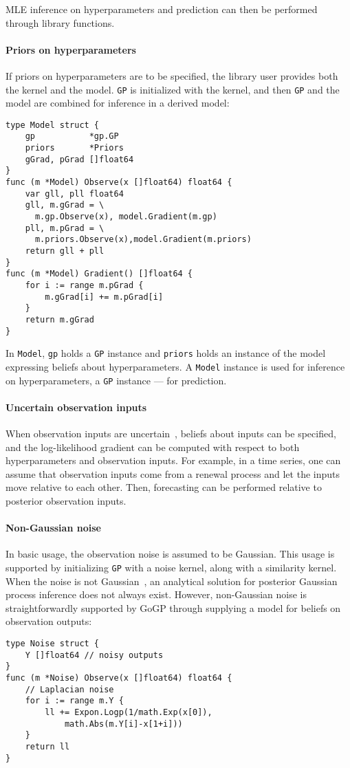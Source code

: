 \documentclass[sigplan,review]{acmart}\settopmatter{printfolios=true,printccs=false,printacmref=false}
\begin{document}
MLE inference on hyperparameters and prediction can then be performed
through library functions.

\paragraph{Priors on hyperparameters}

If priors on hyperparameters are to be specified, the library
user provides both the kernel and the model.  \lstinline{GP} is
initialized with the kernel, and then \lstinline{GP} and the
model are combined for inference in a derived model:
\begin{lstlisting}
type Model struct {
    gp           *gp.GP
    priors       *Priors
    gGrad, pGrad []float64
}
func (m *Model) Observe(x []float64) float64 {
    var gll, pll float64
    gll, m.gGrad = \
      m.gp.Observe(x), model.Gradient(m.gp)
    pll, m.pGrad = \
      m.priors.Observe(x),model.Gradient(m.priors)
    return gll + pll
}
func (m *Model) Gradient() []float64 {
	for i := range m.pGrad {
		m.gGrad[i] += m.pGrad[i]
	}
	return m.gGrad
}
\end{lstlisting}
In \lstinline{Model}, \lstinline{gp} holds a \lstinline{GP}
instance and \lstinline{priors} holds an instance of the model
expressing beliefs about hyperparameters. A \lstinline{Model}
instance is used for inference on hyperparameters, a
\lstinline{GP} instance --- for prediction.

\paragraph{Uncertain observation inputs}

When observation inputs are uncertain~\cite{MR11}, beliefs about inputs can
be specified, and the log-likelihood gradient can be computed
with respect to both hyperparameters and observation inputs. For
example, in a time series, one can assume that observation
inputs come from a renewal process and let the inputs move 
relative to each other. Then, forecasting can be performed 
relative to posterior observation inputs.

\paragraph{Non-Gaussian noise}

In basic usage, the observation noise is assumed to be Gaussian.
This usage is supported by initializing \lstinline{GP} with a noise
kernel, along with a similarity kernel. When the noise is not
Gaussian~\cite{MWN+17}, an analytical solution for posterior Gaussian process
inference does not always exist. However, non-Gaussian noise is
straightforwardly supported by GoGP through supplying a
model for beliefs on observation outputs:
\begin{lstlisting}
type Noise struct {
	Y []float64 // noisy outputs
}
func (m *Noise) Observe(x []float64) float64 {
	// Laplacian noise
	for i := range m.Y {
		ll += Expon.Logp(1/math.Exp(x[0]),
			math.Abs(m.Y[i]-x[1+i]))
	}
	return ll
}
\end{lstlisting}



\end{document}
